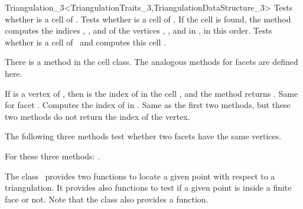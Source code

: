 \begin{ccRefClass}{Triangulation_3<TriangulationTraits_3,TriangulationDataStructure_3>}
{Tests whether  is a cell of \ccVar.}
\ccGlue
{}
{Tests whether  is a cell of \ccVar. 
If the cell  is found, the method
computes the indices , ,  and  of the
vertices , ,  and  in , in this
order. 
}
\ccGlue
{}
{Tests whether  is a cell of \ccVar\ and computes 
this cell .
}

There is a method  in the cell class. The analogous
methods for facets are defined here.

{If  is a vertex of , then  is the index of
 in the cell , and the method returns .
}
\ccGlue
{}
{Same for facet . Computes the index  of  in
.}
\ccGlue
{}
{}
\ccGlue
{}
{Same as the first two methods, but these two methods do not return the
index of the vertex.}

The following three methods test whether two facets have the same
vertices.

{}
\ccGlue
{}
{}
\ccGlue
{}
{For these three methods: .}



The class \ccClassTemplateName\  provides two functions to locate
a given point with respect to a triangulation. It provides
also functions to test if a given point is inside a finite face
or not.  Note that the class  also
provides a  function.


\end{ccRefClass}
